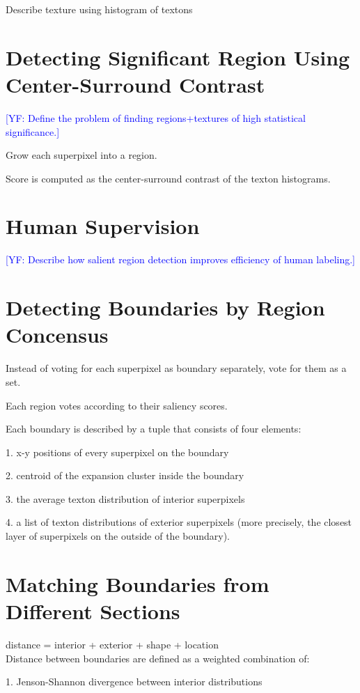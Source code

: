 \documentclass{llncs}
\newcommand{\authcmt}[2]{\textcolor{#1}{#2}}
\newcommand{\yoav}[1]{\authcmt{blue}{[YF: #1]}}
\begin{document}
Describe texture using histogram of textons

\section{Detecting Significant Region Using Center-Surround Contrast}

\yoav{Define the problem of finding regions+textures of high
  statistical significance.}

Grow each superpixel into a region.

Score is computed as the center-surround contrast of the texton histograms.

\section{Human Supervision}

\yoav{Describe how salient region detection improves efficiency of human labeling.}

\section{Detecting Boundaries by Region Concensus}

Instead of voting for each superpixel as boundary separately, vote for them as a set.

Each region votes according to their saliency scores.

Each boundary is described by a tuple that consists of four elements:

1. x-y positions of every superpixel on the boundary

2. centroid of the expansion cluster inside the boundary

3. the average texton distribution of interior superpixels

4. a list of texton distributions of exterior superpixels (more precisely, the closest layer of superpixels on the outside of the boundary).

\section{Matching Boundaries from Different Sections}

distance = interior + exterior + shape + location 
\\

Distance between boundaries are defined as a weighted combination of:

1. Jenson-Shannon divergence between interior distributions
\end{document}
